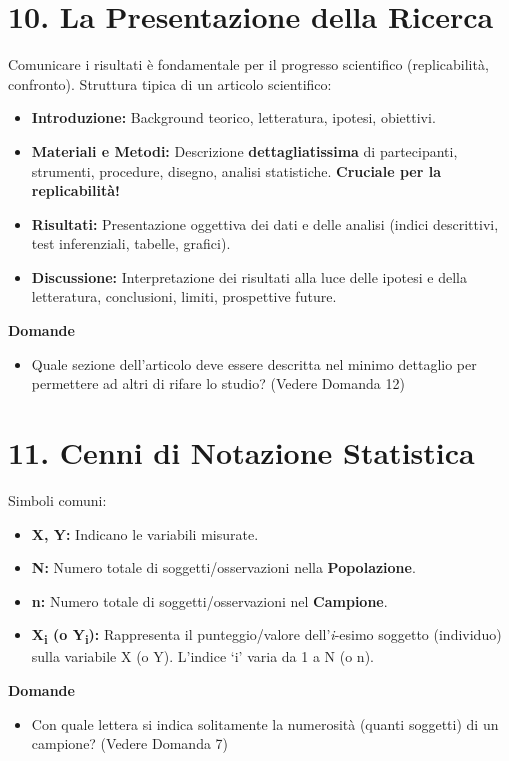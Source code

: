\documentclass[12pt, a4paper]{article}
\newenvironment{reflectionbox}{%
    \begin{framed}\par\medskip\noindent
    \textbf{\color{boxtitlecolor}Domande} \par
    \begin{itemize}[leftmargin=*, label=$\blacktriangleright$]
}{%
    \end{itemize}\par\medskip
    \end{framed}
}
\begin{document}
\section*{10. La Presentazione della Ricerca}
Comunicare i risultati è fondamentale per il progresso scientifico (replicabilità, confronto). Struttura tipica di un articolo scientifico:
\begin{itemize}
    \item \textbf{Introduzione:} Background teorico, letteratura, ipotesi, obiettivi.
    \item \textbf{Materiali e Metodi:} Descrizione \textbf{dettagliatissima} di partecipanti, strumenti, procedure, disegno, analisi statistiche. \textbf{Cruciale per la replicabilità!}
    \item \textbf{Risultati:} Presentazione oggettiva dei dati e delle analisi (indici descrittivi, test inferenziali, tabelle, grafici).
    \item \textbf{Discussione:} Interpretazione dei risultati alla luce delle ipotesi e della letteratura, conclusioni, limiti, prospettive future.
\end{itemize}

\begin{reflectionbox}
    \item Quale sezione dell'articolo deve essere descritta nel minimo dettaglio per permettere ad altri di rifare lo studio? (Vedere Domanda 12)
\end{reflectionbox}

\section*{11. Cenni di Notazione Statistica}
Simboli comuni:
\begin{itemize}
    \item \textbf{X, Y:} Indicano le variabili misurate.
    \item \textbf{N:} Numero totale di soggetti/osservazioni nella \textbf{Popolazione}.
    \item \textbf{n:} Numero totale di soggetti/osservazioni nel \textbf{Campione}.
    \item \textbf{X\textsubscript{i} (o Y\textsubscript{i}):} Rappresenta il punteggio/valore dell'\textit{i}-esimo soggetto (individuo) sulla variabile X (o Y). L'indice `i' varia da 1 a N (o n).
\end{itemize}

\begin{reflectionbox}
    \item Con quale lettera si indica solitamente la numerosità (quanti soggetti) di un campione? (Vedere Domanda 7)
\end{reflectionbox}
\end{document}
